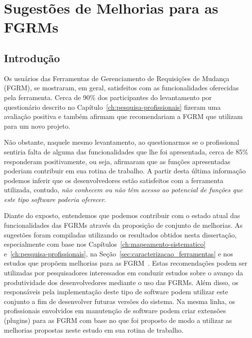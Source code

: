 \chapter{Sugestões de Melhorias para as FGRMs}
\label{ch:sug_melhoria}

\section{Introdução}
\label{sec:sug_melhoria_intro}

Os usuários das Ferramentas de Gerenciamento de Requisições de Mudança (FGRM),
se mostraram, em geral, satisfeitos com as funcionalidades oferecidas pela
ferramenta. Cerca de 90\% dos par\-ti\-ci\-pan\-tes do levantamento por
questionário descrito no Capítulo~\ref{ch:pesquisa-profissionais} fizeram uma
avaliação positiva e também afirmam que recomendariam a FGRM que utilizam para
um novo projeto.

Não obstante, naquele mesmo levantamento, ao questionarmos se o profissional
sentiria falta de alguma das funcionalidades que lhe foi apresentada, cerca de
85\% responderam positivamente, ou seja, afirmaram que as funções apresentadas
poderiam contribuir em sua rotina de trabalho. A partir desta última informação
podemos inferir que os desenvolvedores estão satisfeitos com a ferramenta
utilizada, contudo, \textit{não conhecem ou não têm acesso ao potencial de
	funções que este tipo software poderia oferecer}.

Diante do exposto, entendemos que podemos contribuir com o estado a\-tu\-al das
funcionalidades das FGRMs através da proposição de conjunto de melhorias.  As
sugestões foram compiladas utilizando os resultados obtidos nesta dissertação,
especialmente com base nos Capítulos~\ref{ch:mapeamento-sistematico}
e~\ref{ch:pesquisa-profissionais}, na Seção~\ref{sec:caracterizacao_ferramentas}
e nos estudos que propõem melhorias para as FGRM~\cite{zimmermann2009improving,
	bettenburg2008makes, singh2011bug}.  Estas recomendações podem ser
utilizadas por pesquisadores interessados em conduzir estudos sobre o avanço da
produtividade dos desenvolvedores mediante o uso das FGRMs. Além disso, os
responsáveis pela implementação deste tipo de software podem utilizar este
conjunto a fim de desenvolver futuras versões do sistema. Na mesma linha, os
profissionais envolvidos em manutenção de software podem criar extensões
(plugins) para as FGRM com base no que foi proposto de modo a utilizar as
melhorias propostas neste estudo em sua rotina de trabalho.

